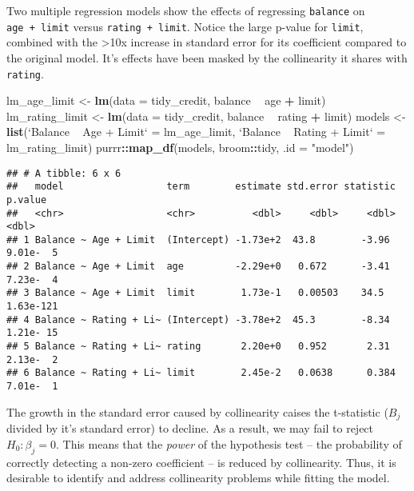 \documentclass[]{book}
\newenvironment{Shaded}{\begin{snugshade}}{\end{snugshade}}
\newcommand{\DataTypeTok}[1]{\textcolor[rgb]{0.13,0.29,0.53}{#1}}
\newcommand{\KeywordTok}[1]{\textcolor[rgb]{0.13,0.29,0.53}{\textbf{#1}}}
\newcommand{\NormalTok}[1]{#1}
\newcommand{\OperatorTok}[1]{\textcolor[rgb]{0.81,0.36,0.00}{\textbf{#1}}}
\newcommand{\StringTok}[1]{\textcolor[rgb]{0.31,0.60,0.02}{#1}}
\begin{document}
Two multiple regression models show the effects of regressing \texttt{balance} on \texttt{age\ +\ limit} versus \texttt{rating\ +\ limit}. Notice the large p-value for \texttt{limit}, combined with the \textgreater{}10x increase in standard error for its coefficient compared to the original model. It's effects have been masked by the collinearity it shares with \texttt{rating}.

\begin{Shaded}
\begin{Highlighting}[]
\NormalTok{lm_age_limit <-}\StringTok{ }\KeywordTok{lm}\NormalTok{(}\DataTypeTok{data =}\NormalTok{ tidy_credit, balance }\OperatorTok{~}\StringTok{ }\NormalTok{age }\OperatorTok{+}\StringTok{ }\NormalTok{limit)}
\NormalTok{lm_rating_limit <-}\StringTok{ }\KeywordTok{lm}\NormalTok{(}\DataTypeTok{data =}\NormalTok{ tidy_credit, balance }\OperatorTok{~}\StringTok{ }\NormalTok{rating }\OperatorTok{+}\StringTok{ }\NormalTok{limit)}
\NormalTok{models <-}\StringTok{ }\KeywordTok{list}\NormalTok{(}\StringTok{`}\DataTypeTok{Balance ~ Age + Limit}\StringTok{`}\NormalTok{ =}\StringTok{ }\NormalTok{lm_age_limit,}
               \StringTok{`}\DataTypeTok{Balance ~ Rating + Limit}\StringTok{`}\NormalTok{ =}\StringTok{ }\NormalTok{lm_rating_limit)}
\NormalTok{purrr}\OperatorTok{::}\KeywordTok{map_df}\NormalTok{(models, broom}\OperatorTok{::}\NormalTok{tidy, }\DataTypeTok{.id =} \StringTok{"model"}\NormalTok{)}
\end{Highlighting}
\end{Shaded}

\begin{verbatim}
## # A tibble: 6 x 6
##   model                  term        estimate std.error statistic   p.value
##   <chr>                  <chr>          <dbl>     <dbl>     <dbl>     <dbl>
## 1 Balance ~ Age + Limit  (Intercept) -1.73e+2  43.8        -3.96  9.01e-  5
## 2 Balance ~ Age + Limit  age         -2.29e+0   0.672      -3.41  7.23e-  4
## 3 Balance ~ Age + Limit  limit        1.73e-1   0.00503    34.5   1.63e-121
## 4 Balance ~ Rating + Li~ (Intercept) -3.78e+2  45.3        -8.34  1.21e- 15
## 5 Balance ~ Rating + Li~ rating       2.20e+0   0.952       2.31  2.13e-  2
## 6 Balance ~ Rating + Li~ limit        2.45e-2   0.0638      0.384 7.01e-  1
\end{verbatim}

The growth in the standard error caused by collinearity caises the t-statistic (\(B_j\) divided by it's standard error) to decline. As a result, we may fail to reject \(H_0: \beta_j = 0\). This means that the \emph{power} of the hypothesis test -- the probability of correctly detecting a non-zero coefficient -- is reduced by collinearity. Thus, it is desirable to identify and address collinearity problems while fitting the model.
\end{document}
